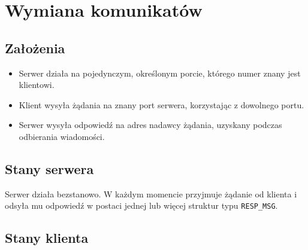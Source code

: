 \documentclass[a4paper,11pt,titlepage]{article}
\begin{document}
\section{Wymiana komunikatów}

\subsection{Założenia}
\begin{itemize}
\item Serwer działa na pojedynczym, określonym porcie, którego numer znany
      jest klientowi.
\item Klient wysyła żądania na znany port serwera, korzystając z
      dowolnego portu.
\item Serwer wysyła odpowiedź na adres nadawcy żądania, uzyskany podczas
      odbierania wiadomości.
\end{itemize}

\subsection{Stany serwera}
Serwer działa bezstanowo. W każdym momencie przyjmuje żądanie od klienta i odsyła
mu odpowiedź w postaci jednej lub więcej struktur typu \texttt{RESP\_MSG}.

\subsection{Stany klienta}
\end{document}
